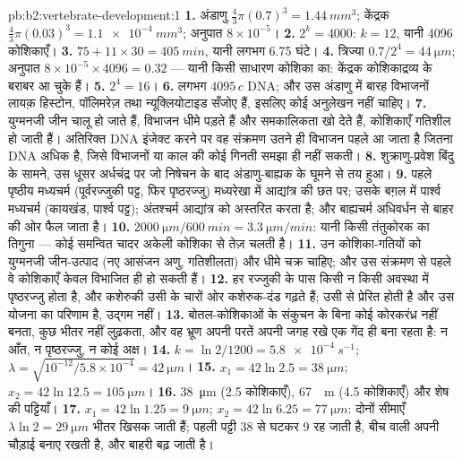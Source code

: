 \begin{solution}{pb:b2:vertebrate-development:1}
\textbf{1.} अंडाणु $\tfrac43\pi(0.7)^{3} = \qty{1.44}{mm^3}$; केंद्रक
$\tfrac43\pi(0.03)^{3} = \qty{1.1e-4}{mm^3}$; अनुपात $8\times
10^{-5}$।
\textbf{2.} $2^{k} = 4000$: $k = 12$, यानी 4096 कोशिकाएँ।
\textbf{3.} $75 + 11\times 30 = \qty{405}{min}$, यानी लगभग 6.75 घंटे।
\textbf{4.} त्रिज्या $0.7/2^{4} = \qty{44}{\micro m}$; अनुपात $8\times
10^{-5}\times 4096 = 0.32$ --- यानी किसी साधारण कोशिका का: केंद्रक
कोशिकाद्रव्य के बराबर आ चुके हैं।
\textbf{5.} $2^{4} = 16$।
\textbf{6.} लगभग $4095\,c$ DNA; और उस अंडाणु में बारह विभाजनों लायक़
हिस्टोन, पॉलिमरेज़ तथा न्यूक्लियोटाइड सँजोए हैं, इसलिए कोई
अनुलेखन नहीं चाहिए।
\textbf{7.} युग्मनजी जीन चालू हो जाते हैं, विभाजन धीमे पड़ते हैं और
समकालिकता खो देते हैं, कोशिकाएँ गतिशील हो जाती हैं। अतिरिक्त DNA इंजेक्ट
करने पर वह संक्रमण उतने ही विभाजन पहले आ जाता है जितना DNA अधिक है,
जिसे विभाजनों या काल की कोई गिनती समझा ही नहीं सकती।
\textbf{8.} शुक्राणु-प्रवेश बिंदु के सामने, उस धूसर अर्धचंद्र पर जो
निषेचन के बाद अंडाणु-बाह्यक के घूमने से तय हुआ।
\textbf{9.} पहले पृष्ठीय मध्यचर्म (पूर्वरज्जुकी पट्ट, फिर पृष्ठरज्जु)
मध्यरेखा में आद्यांत्र की छत पर; उसके बग़ल में पार्श्व मध्यचर्म
(कायखंड, पार्श्व पट्ट); अंतश्चर्म
आद्यांत्र को अस्तरित करता है; और बाह्यचर्म अधिवर्धन से बाहर की ओर फैल जाता है।
\textbf{10.} $\qty{2000}{\micro m}/\qty{600}{min} = \qty{3.3}{\micro
m/min}$: यानी किसी तंतुकोरक का तिगुना --- कोई समन्वित चादर अकेली
कोशिका से तेज़ चलती है।
\textbf{11.} उन कोशिका-गतियों को युग्मनजी जीन-उत्पाद (नए
आसंजन अणु, गतिशीलता) और धीमे चक्र चाहिए; और उस संक्रमण से पहले वे
कोशिकाएँ केवल विभाजित ही हो सकती हैं।
\textbf{12.} हर रज्जुकी के पास किसी न किसी अवस्था में पृष्ठरज्जु होता
है, और कशेरुकी उसी के चारों ओर कशेरुक-दंड गढ़ते हैं; 
उसी से प्रेरित होती है और उस योजना का परिणाम है, उद्गम नहीं।
\textbf{13.} बोतल-कोशिकाओं के संकुचन के बिना कोई कोरकरंध्र नहीं बनता,
कुछ भीतर नहीं लुढ़कता, और वह भ्रूण अपनी परतें अपनी जगह रखे एक गेंद ही बना
रहता है: न आँत, न पृष्ठरज्जु, न कोई अक्ष।
\textbf{14.} $k = \ln 2/1200 = \qty{5.8e-4}{s^{-1}}$; $\lambda =
\sqrt{10^{-12}/5.8\times 10^{-4}} = \qty{42}{\micro m}$।
\textbf{15.} $x_1 = 42\ln 2.5 = \qty{38}{\micro m}$; $x_2 = 42\ln 12.5
= \qty{105}{\micro m}$।
\textbf{16.} \qty{38}{\micro m} (2.5 कोशिकाएँ), \qty{67}{\micro
m} (4.5 कोशिकाएँ) और शेष की पट्टियाँ।
\textbf{17.} $x_1 = 42\ln 1.25 = \qty{9}{\micro m}$; $x_2 = 42\ln 6.25
= \qty{77}{\micro m}$: दोनों सीमाएँ $\lambda\ln 2 =
\qty{29}{\micro m}$ भीतर खिसक जाती हैं; पहली पट्टी 38 से घटकर 9 रह जाती
है, बीच वाली अपनी चौड़ाई बनाए रखती है, और बाहरी बढ़ जाती है।

\end{solution}
